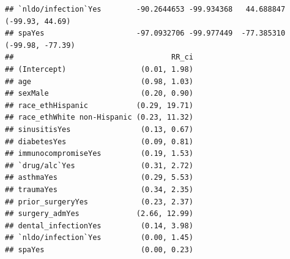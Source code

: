 \documentclass[
]{article}
\begin{document}
\begin{verbatim}
## `nldo/infection`Yes        -90.2644653 -99.934368   44.688847   (-99.93, 44.69)
## spaYes                     -97.0932706 -99.977449  -77.385310  (-99.98, -77.39)
##                                    RR_ci
## (Intercept)                 (0.01, 1.98)
## age                         (0.98, 1.03)
## sexMale                     (0.20, 0.90)
## race_ethHispanic           (0.29, 19.71)
## race_ethWhite non-Hispanic (0.23, 11.32)
## sinusitisYes                (0.13, 0.67)
## diabetesYes                 (0.09, 0.81)
## immunocompromiseYes         (0.19, 1.53)
## `drug/alc`Yes               (0.31, 2.72)
## asthmaYes                   (0.29, 5.53)
## traumaYes                   (0.34, 2.35)
## prior_surgeryYes            (0.23, 2.37)
## surgery_admYes             (2.66, 12.99)
## dental_infectionYes         (0.14, 3.98)
## `nldo/infection`Yes         (0.00, 1.45)
## spaYes                      (0.00, 0.23)
\end{verbatim}
\end{document}
